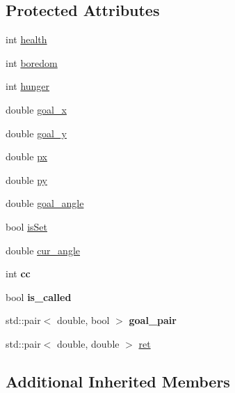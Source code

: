 \subsection*{Protected Attributes}
\begin{DoxyCompactItemize}
\item 
int \hyperlink{classResident_ac603d9684120e1ab66a4340797bb7e90}{health}
\item 
int \hyperlink{classResident_acc61e75ef963ee7a6945b4d2ae9c55e6}{boredom}
\item 
int \hyperlink{classResident_a337df4272a4640a4039dfbe5c5c4a6d6}{hunger}
\item 
double \hyperlink{classResident_adee57a6649dfa4a41d027fbb8d961226}{goal\-\_\-x}
\item 
double \hyperlink{classResident_a30e28a999b67c4db3500c9c3c9989a10}{goal\-\_\-y}
\item 
double \hyperlink{classResident_aa147b3e473b2ea32b732eb5146ec7e34}{px}
\item 
double \hyperlink{classResident_ac757cac74a1712dd5746d1c3f5702a21}{py}
\item 
double \hyperlink{classResident_a194117576f1937cac43ac1b05b884085}{goal\-\_\-angle}
\item 
bool \hyperlink{classResident_ac5e7527b191e07372c3ea5e9aa81a65d}{is\-Set}
\item 
double \hyperlink{classResident_a4781565db7a2e58566d2120623fbc13e}{cur\-\_\-angle}
\item 
\hypertarget{classResident_ab17c0dfd1b011b6e166f987f823892da}{int {\bfseries cc}}\label{classResident_ab17c0dfd1b011b6e166f987f823892da}

\item 
\hypertarget{classResident_aa2c1d458eb7b852af9aaa39132e0d85a}{bool {\bfseries is\-\_\-called}}\label{classResident_aa2c1d458eb7b852af9aaa39132e0d85a}

\item 
\hypertarget{classResident_af86d17339240199486745bdd27da0ca5}{std\-::pair$<$ double, bool $>$ {\bfseries goal\-\_\-pair}}\label{classResident_af86d17339240199486745bdd27da0ca5}

\item 
std\-::pair$<$ double, double $>$ \hyperlink{classResident_a790131eeebec8aed96b90bd1d9ce7fef}{ret}
\end{DoxyCompactItemize}
\subsection*{Additional Inherited Members}


